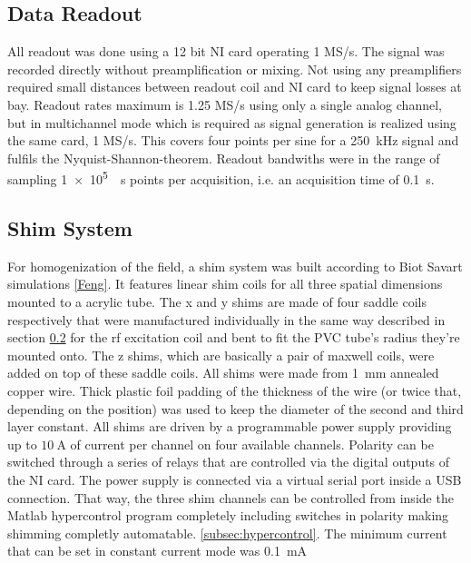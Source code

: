         \subsection{Data Readout}
            All readout was done using a 12 bit NI  card operating 1 MS/s. The signal was recorded directly without preamplification or mixing. Not using any preamplifiers required small distances between readout coil and NI card to keep signal losses at bay. Readout rates maximum is 1.25 MS/s using only a single analog channel, but in multichannel mode which is required as signal generation is realized using the same card, 1 MS/s. This covers four points per sine for a \SI{250}{\kilo\hertz} signal and fulfils the Nyquist-Shannon-theorem. Readout bandwiths were in the range of  sampling \SI{1e5}{\per\second} points per acquisition, i.e. an acquisition time of \SI{0.1}{\second}.
        \subsection{Shim System}
        For homogenization of the field, a shim system was built according to Biot Savart simulations \ref{Feng}. It features linear shim coils for all three spatial dimensions mounted to a  acrylic tube. The x and y shims are made of four saddle coils respectively that were manufactured individually in the same way described in section \ref{} for the rf excitation coil and bent to fit the PVC tube's radius they're mounted onto. The z shims, which are basically a pair of maxwell coils, were added on top of these saddle coils. All shims were made from \SI{1}{\mm} annealed copper wire. Thick plastic foil padding of the thickness of the wire (or twice that, depending on the position) was used to keep the diameter of the second and third layer constant. All shims are driven by a  programmable power supply providing up to $\SI{10}{\ampere}$ of current per channel on four available channels. Polarity can be switched through a series of relays that are controlled via the digital outputs of the NI card. The power supply is connected via a virtual serial port inside a USB connection. That way, the three shim channels can be controlled from inside the Matlab hypercontrol program completely including switches in polarity making shimming completly automatable. \ref{subsec:hypercontrol}.
        The minimum current that can be set in constant current mode was \SI{0.1}{\milli\ampere}
